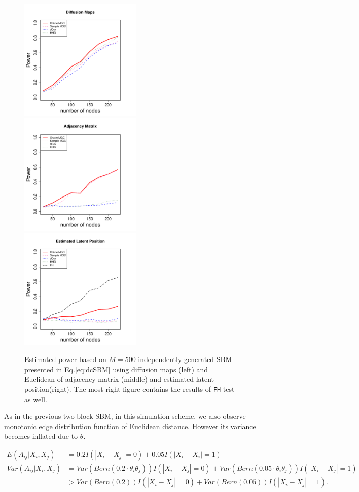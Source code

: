 \documentclass[12pt]{article}
\theoremstyle{definition}
\begin{document}
\begin{figure}[H]
	\centering
	\includegraphics[width=2.3in]{../Figure/dcSBM.pdf}
	\includegraphics[width=2.3in]{../Figure/EdcSBM.pdf}
	\includegraphics[width =2.3in]{../Figure/fdcSBM.pdf}
	\caption{Estimated power based on $M = 500$ independently generated SBM presented in Eq.\ref{eq:dcSBM} using diffusion maps (left) and Euclidean of adjacency matrix (middle)  and estimated latent position(right). The most right figure contains the results of \texttt{FH} test as well.}
		\label{fig:dcSBM}
\end{figure}	

As in the previous two block SBM, in this simulation scheme, we also observe monotonic edge distribution function of Euclidean distance. However its variance becomes inflated due to $\theta$. 	
	
\begin{equation}
\begin{aligned}
E(A_{ij} | X_{i}, X_{j}) &  =  0.2 I(|X_{i} - X_{j}| = 0) + 0.05 I(|X_{i} - X_{i}| = 1) \\
Var(A_{ij} | X_{i}, X_{j}) & = Var( Bern(0.2 \cdot \theta_{i} \theta_{j})) I(|X_{i} - X_{j}| = 0) +
Var( Bern(0.05 \cdot \theta_{i} \theta_{j}) ) I( |X_{i} - X_{j}| = 1) \\
& > Var(Bern(0.2)) I(|X_{i} - X_{j}| = 0) + Var(Bern(0.05)) I(|X_{i} - X_{j}| = 1).
\end{aligned}
\label{eq:dcVariance}
\end{equation}	
	
\end{document}
